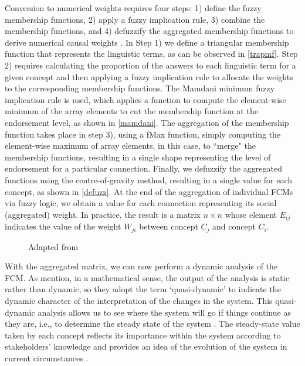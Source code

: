 \begin{appendices}
Conversion to numerical weights requires four steps: 1) define the fuzzy membership functions, 2) apply a fuzzy implication rule, 3) combine the membership functions, and 4) defuzzify the aggregated membership functions to derive numerical causal weights \citep{mkhitaryan2022fcmpy}. In Step 1) we define a triangular membership function that represents the linguistic terms, as can be observed in \cref{trapmf}. Step 2) requires calculating the proportion of the answers to each linguistic term for a given concept and then applying a fuzzy implication rule to allocate the weights to the corresponding membership functions. The Mamdani minimum fuzzy implication rule is used, which applies a function to compute the element-wise minimum of the array elements to cut the membership function at the endorsement level, as shown in \cref{mamdani}. The aggregation of the membership function takes place in step 3), using a fMax function, simply computing the element-wise maximum of array elements, in this case, to ``merge" the membership functions, resulting in a single shape representing the level of endorsement for a particular connection. Finally, we defuzzify the aggregated functions using the centre-of-gravity method, resulting in a single value for each concept, as shown in \cref{defuzz}. At the end of the aggregation of individual FCMs via fuzzy logic, we obtain a value for each connection representing its social (aggregated) weight. In practice, the result is a matrix $n \times n$ whose element $ E_{ij} $ indicates the value of the weight $ W_{ji} $ between concept $ C_{j} $ and concept $ C_{i} $. 



\begin{figure}\centering
{}\hfill
{}\par 
{}
\caption*{Adapted from \cite{mkhitaryan2022fcmpy}}
\label{FCMpy}
\end{figure}


With the aggregated matrix, we can now perform a dynamic analysis of the FCM. As \cite{edwards2021building} mention, in a mathematical sense, the output of the analysis is static rather than dynamic, so they adopt the term ‘quasi-dynamic’ to indicate the dynamic character of the interpretation of the changes in the system. This quasi-dynamic analysis allows us to see where the system will go if things continue as they are, i.e., to determine the steady state of the system \citep{ozesmi2004ecological}. The steady-state value taken by each concept reflects its importance within the system according to stakeholders' knowledge and provides an idea of the evolution of the system in current circumstances \citep{lopolito2020combined}. 


\end{appendices}

